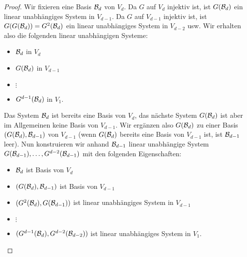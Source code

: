 \begin{proof}
	Wir fixieren eine Basis $\mathcal{B}_d$ von $V_d$. Da $G$ auf $V_d$ injektiv ist, ist $G(\mathcal{B}_d)$ ein linear unabhängiges System in $V_{d-1}$.  Da $G$ auf $V_{d-1}$ injektiv ist, ist $G(G(\mathcal{B}_d)) = G^2(\mathcal{B}_d)$ ein linear unabhängiges System in $V_{d-2}$ usw. Wir erhalten also die folgenden linear unabhängigen Systeme:
	\begin{itemize}
			\item[] $\mathcal{B}_d$ in $V_d$
			\item[] $G(\mathcal{B}_d)$ in $V_{d-1}$
			\item[] $\vdots$
			\item[] $G^{d-1}(\mathcal{B}_d)$ in $V_1$. 
	\end{itemize} 
	Das System $\mathcal{B}_d$ ist bereits eine Basis von $V_d$, das nächste System $G(\mathcal{B}_d)$ ist aber im Allgemeinen keine Basis von $V_{d-1}$. Wir ergänzen also $G(\mathcal{B}_d)$ zu einer Basis $(G(\mathcal{B}_d), \mathcal{B}_{d-1})$ von $V_{d-1}$ (wenn $G(\mathcal{B}_d)$ bereits eine Basis von $V_{d-1}$ ist, ist $\mathcal{B}_{d-1}$ leer). Nun konstruieren wir anhand $\mathcal{B}_{d-1}$ linear unabhängige System $G(\mathcal{B}_{d-1}),\ldots, G^{d-2} (\mathcal{B}_{d-1})$ mit den folgenden Eigenschaften: 
	\begin{itemize}
		\item[] $\mathcal{B}_d$ ist Basis von $V_d$
		\item[] $(G(\mathcal{B}_d),\mathcal{B}_{d-1})$ ist Basis von $V_{d-1}$
		\item[] $(G^2(\mathcal{B}_d),G(\mathcal{B}_{d-1}))$ ist linear unabhängiges System in $V_{d-1}$
		\item[] $\vdots$
		\item[] $(G^{d-1}(\mathcal{B}_d), G^{d-2}(\mathcal{B}_{d-2}))$ ist linear unabhängiges System in $V_1$. 
	\end{itemize} 


\end{proof}
